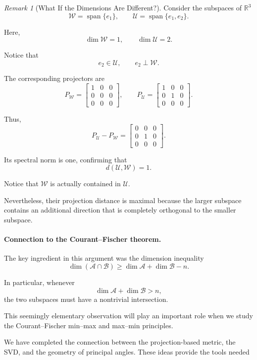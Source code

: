 \documentclass[14pt,letterpaper]{article}
\theoremstyle{plain}
\theoremstyle{definition}
\theoremstyle{remark}
\newtheorem{remark}[theorem]{Remark}
\newcommand{\R}{\mathbb{R}}
\DeclareMathOperator{\Span}{span}
\begin{document}
\begin{remark}[What If the Dimensions Are Different?]
Consider the subspaces of $\R^3$
\[
\mathcal W=\Span\{e_1\},
\qquad
\mathcal U=\Span\{e_1,e_2\}.
\]

Here,
\[
\dim\mathcal W=1,
\qquad
\dim\mathcal U=2.
\]

Notice that
\[
e_2\in\mathcal U,
\qquad
e_2\perp\mathcal W.
\]

The corresponding projectors are
\[
P_{\mathcal W}
=
\begin{bmatrix}
1&0&0\\
0&0&0\\
0&0&0
\end{bmatrix},
\qquad
P_{\mathcal U}
=
\begin{bmatrix}
1&0&0\\
0&1&0\\
0&0&0
\end{bmatrix}.
\]

Thus,
\[
P_{\mathcal U}-P_{\mathcal W}
=
\begin{bmatrix}
0&0&0\\
0&1&0\\
0&0&0
\end{bmatrix}.
\]

Its spectral norm is one, confirming that
\[
\boxed{
d(\mathcal U,\mathcal W)=1.
}
\]

Notice that $\mathcal W$ is actually
contained in $\mathcal U$.

Nevertheless, their projection distance
is maximal because the larger subspace
contains an additional direction that
is completely orthogonal to the smaller
subspace.

\paragraph{Connection to the Courant--Fischer theorem.}

The key ingredient in this argument was
the dimension inequality
\[
\boxed{
\dim(\mathcal A\cap\mathcal B)
\geq
\dim\mathcal A+\dim\mathcal B-n.
}
\]

In particular, whenever
\[
\dim\mathcal A+\dim\mathcal B>n,
\]
the two subspaces must have a
nontrivial intersection.

This seemingly elementary observation
will play an important role when we
study the Courant--Fischer min--max
and max--min principles.


\end{remark}
We have completed the connection between the
projection-based metric, the SVD, and the geometry of
principal angles. These ideas provide the tools needed
\end{document}
